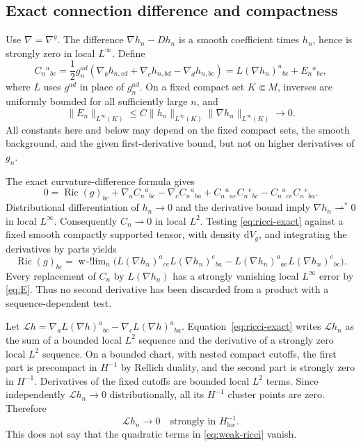 \documentclass[11pt,a4paper]{article}
\numberwithin{equation}{section}
\newcommand{\Ric}{\operatorname{Ric}}
\newcommand{\loc}{\mathrm{loc}}
\newcommand{\dd}{\mathrm d}
\newcommand{\dV}{\dd V_g}
\newcommand{\f}[2]{\frac{#1}{#2}}
\theoremstyle{definition}
\begin{document}
\subsection{Exact connection difference and compactness}

Use $\nabla=\nabla^g$. The difference $\nabla h_n-Dh_n$ is a smooth coefficient times $h_n$, hence is strongly zero in local $L^\infty$. Define
\begin{equation*}
C_n{}^a{}_{bc}=\f12g_n^{ad}(\nabla_bh_{n,cd}+\nabla_ch_{n,bd}-\nabla_dh_{n,bc})
=L(\nabla h_n)^a{}_{bc}+E_n{}^a{}_{bc},
\end{equation*}
where $L$ uses $g^{ad}$ in place of $g_n^{ad}$. On a fixed compact set $K\Subset M$, inverses are uniformly bounded for all sufficiently large $n$, and
\begin{equation}\label{eq:E}
\|E_n\|_{L^\infty(K)}\leq C\|h_n\|_{L^\infty(K)}\|\nabla h_n\|_{L^\infty(K)}\longrightarrow0.
\end{equation}
All constants here and below may depend on the fixed compact sets, the smooth background, and the given first-derivative bound, but not on higher derivatives of $g_n$.

The exact curvature-difference formula gives
\begin{equation}\label{eq:ricci-exact}
0=\Ric(g)_{bc}+\nabla_aC_n{}^a{}_{bc}-\nabla_cC_n{}^a{}_{ba}
+C_n{}^a{}_{ae}C_n{}^e{}_{bc}-C_n{}^a{}_{ce}C_n{}^e{}_{ba}.
\end{equation}
Distributional differentiation of $h_n\to0$ and the derivative bound imply $\nabla h_n\rightharpoonup^*0$ in local $L^\infty$. Consequently $C_n\rightharpoonup0$ in local $L^2$. Testing \eqref{eq:ricci-exact} against a fixed smooth compactly supported tensor, with density $\dV$, and integrating the derivatives by parts yields
\begin{equation}\label{eq:weak-ricci}
\Ric(g)_{bc}=\mathop{\mathrm{w\!-!lim}}_n
\bigl(L(\nabla h_n)^a{}_{ce}L(\nabla h_n)^e{}_{ba}
-L(\nabla h_n)^a{}_{ae}L(\nabla h_n)^e{}_{bc}\bigr).
\end{equation}
Every replacement of $C_n$ by $L(\nabla h_n)$ has a strongly vanishing local $L^\infty$ error by \eqref{eq:E}. Thus no second derivative has been discarded from a product with a sequence-dependent test.

Let $\mathcal Lh=\nabla_aL(\nabla h)^a{}_{bc}-\nabla_cL(\nabla h)^a{}_{ba}$. Equation~\eqref{eq:ricci-exact} writes $\mathcal Lh_n$ as the sum of a bounded local $L^2$ sequence and the derivative of a strongly zero local $L^2$ sequence. On a bounded chart, with nested compact cutoffs, the first part is precompact in $H^{-1}$ by Rellich duality, and the second part is strongly zero in $H^{-1}$. Derivatives of the fixed cutoffs are bounded local $L^2$ terms. Since independently $\mathcal Lh_n\to0$ distributionally, all its $H^{-1}$ cluster points are zero. Therefore
\begin{equation}\label{eq:ricci-Hminus}
\mathcal Lh_n\longrightarrow0\quad\text{strongly in }H^{-1}_{\loc}.
\end{equation}
This does not say that the quadratic terms in \eqref{eq:weak-ricci} vanish.
\end{document}
